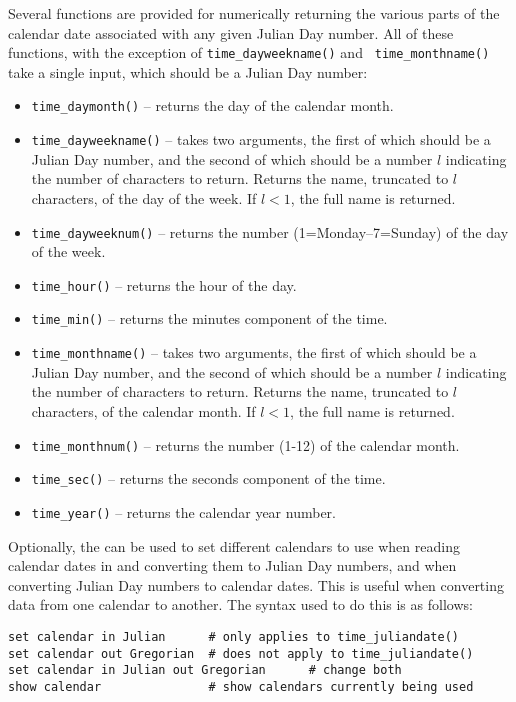 Several functions are provided for numerically returning the various parts of
the calendar date associated with any given Julian Day number. All of these
functions, with the exception of {\tt time\_\-dayweekname()} and {\tt
time\_\-monthname()} take a single input, which should be a Julian Day number:

\begin{itemize}
\item {\tt time\_daymonth()}     -- returns the day of the calendar month.
\item {\tt time\_dayweekname()}  -- takes two arguments, the first of which should be a Julian Day number, and the second of which should be a number $l$ indicating the number of characters to return. Returns the name, truncated to $l$ characters, of the day of the week. If $l<1$, the full name is returned.
\item {\tt time\_dayweeknum()}   -- returns the number (1=Monday--7=Sunday) of the day of the week.
\item {\tt time\_hour()}         -- returns the hour of the day.
\item {\tt time\_min()}          -- returns the minutes component of the time.
\item {\tt time\_monthname()}    -- takes two arguments, the first of which should be a Julian Day number, and the second of which should be a number $l$ indicating the number of characters to return. Returns the name, truncated to $l$ characters, of the calendar month. If $l<1$, the full name is returned.
\item {\tt time\_monthnum()}     -- returns the number (1-12) of the calendar month.
\item {\tt time\_sec()}          -- returns the seconds component of the time.
\item {\tt time\_year()}         -- returns the calendar year number.
\end{itemize}

Optionally, the  can be used to set different calendars
to use when reading calendar dates in and converting them to Julian Day
numbers, and when converting Julian Day numbers to calendar dates. This is
useful when converting data from one calendar to another. The syntax used to do
this is as follows:
\begin{verbatim}
set calendar in Julian      # only applies to time_juliandate()
set calendar out Gregorian  # does not apply to time_juliandate()
set calendar in Julian out Gregorian      # change both
show calendar               # show calendars currently being used
\end{verbatim}

